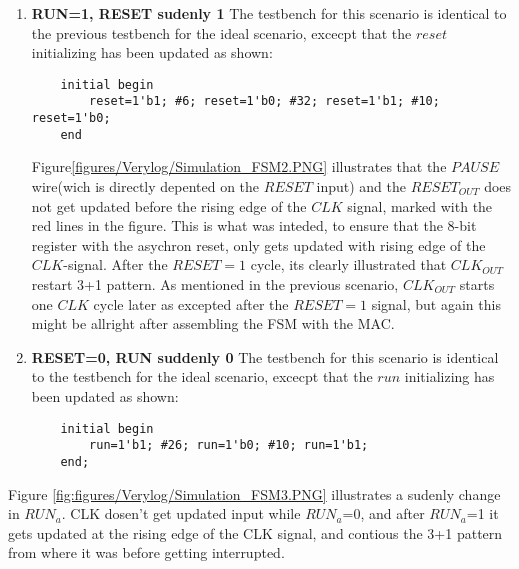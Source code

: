 \begin{enumerate}
    \item \textbf{RUN=1, RESET sudenly 1}
    The testbench for this scenario is identical to the previous testbench for the ideal scenario, excecpt that the $reset$ initializing has been updated as shown:
\begin{lstlisting} 
	initial begin
		reset=1'b1; #6; reset=1'b0; #32; reset=1'b1; #10; reset=1'b0;
	end	
\end{lstlisting}
Figure\ref{figures/Verylog/Simulation_FSM2.PNG} illustrates that the $PAUSE$ wire(wich is directly depented on the $RESET$ input) and the $RESET_{OUT}$ does not get updated before the rising edge of the $CLK$ signal, marked with the red lines in the figure. This is what was inteded, to ensure that the 8-bit register with the asychron reset, only gets updated with rising edge of the $CLK$-signal. After the $RESET=1$ cycle, its clearly illustrated that $CLK_{OUT}$ restart 3+1 pattern. As mentioned in the previous scenario, $CLK_{OUT}$ starts one $CLK$ cycle later as excepted after the $RESET=1$ signal, but again this might be allright after assembling the FSM with the MAC.
\item \textbf{RESET=0, RUN suddenly 0}
    The testbench for this scenario is identical to the testbench for the ideal scenario, excecpt that the $run$ initializing has been updated as shown:
\begin{lstlisting} 
	initial begin
		run=1'b1; #26; run=1'b0; #10; run=1'b1;	
	end;
\end{lstlisting}

\end{enumerate}
Figure \ref{fig:figures/Verylog/Simulation_FSM3.PNG} illustrates a sudenly change in $RUN_a$.  CLK dosen't get updated input while $RUN_a$=0, and after $RUN_a$=1 it gets updated at the rising edge of the CLK signal, and contious the 3+1 pattern from where it was before getting interrupted. 